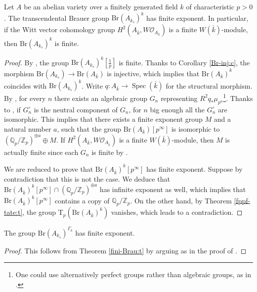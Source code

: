 \documentclass[11pt]{amsart}
\newcommand{\spa}{\medskip}
\newcommand{\kbar}{{\bar{k}}}
\newcommand{\Zp}{{\mathbb{Z}_{p}}}
\newcommand{\Qp}{{\mathbb{Q}_{p}}}
\newcommand{\calO}{\mathcal{O}}
\DeclareMathOperator{\Spec}{Spec}
\newcommand{\Br}{\mathrm{Br}}
\newcommand{\ks}{{k_s}}
\newcommand{\Tp}{\mathrm{T}_p}
\begin{document}
\begin{theo}\label{fini-Brau:t}
	Let $A$ be an abelian variety over a finitely generated field $k$ of characteristic $p>0$. The transcendental Brauer group $\Br(A_{\ks})^{k}$ has finite exponent. In particular, if the Witt vector cohomology group $H^2(A_{\kbar},W\calO_{A_\kbar})$ is a finite $W(\kbar)$-module, then $\Br(A_{\ks})^{k}$ is finite.
\end{theo}
\begin{proof}By \cite[Thm. 16.2.3]{CS21}, the group $\Br(A_{\ks})^{k}[\tfrac{1}{p}]$ is finite. Thanks to Corollary \ref{Br-inj:c}, the morphism $\Br(A_{\ks})\to \Br(A_{\kbar})$ is injective, which implies that $\Br(A_{\kbar})^{k}$ coincides with $\Br(A_{\ks})^{k}$. 
	Write $q: A_\kbar \to \Spec(\kbar)$ for the structural morphism. By \cite[Cor. 1.4]{BO21}, for every $n$ there exists an algebraic group $G_n$ representing $R^2q_{*}\mu_{p^n}$\footnote{One could use alternatively perfect groups rather than algebraic groups, as in \cite[Lem. 1.8]{Mil86}.}. Thanks to \cite[Prop. 3.1]{Mil86}, if $G_n^\circ$ is the neutral component of $G_n$, for $n$ big enough all the $G_n^\circ$ are isomorphic. This implies that there exists a finite exponent group $M$ and a natural number $a$, such that the group $\Br(A_\kbar)[p^\infty]$ is isomorphic to $(\Qp/\Zp)^{\oplus a}\oplus M$. If $H^2(A_{\kbar},W\calO_{A_\kbar})$ is a finite $W(\kbar)$-module, then $M$ is actually finite since each $G_n$ is finite by \cite[Cor. 12.5]{BO21}.  
	
	\spa
	
	 We are reduced to prove that $\Br(A_{\kbar})^{k}[p^\infty]$ has finite exponent. Suppose by contradiction that this is not the case. We deduce that $\Br(A_{\kbar})^{k}[p^\infty]\cap (\Qp/\Zp)^{\oplus a}$ has infinite exponent as well, which implies that $\Br(A_{\kbar})^{k}[p^\infty]$ contains a copy of $\Qp/\Zp$. On the other hand, by Theorem \ref{fppf-tate:t}, the group $\Tp(\Br(A_{\kbar})^{k})$ vanishes, which leads to a contradiction.
\end{proof}

\begin{coro}\label{galo-fixe:c}
The group $\Br(A_{\ks})^{\Gamma_k}$ has finite exponent.
\end{coro}
\begin{proof}
This follows from Theorem \ref{fini-Brau:t} by arguing as in the proof of \cite[Thm. 2.1]{CS13}.
\end{proof}
\end{document}
